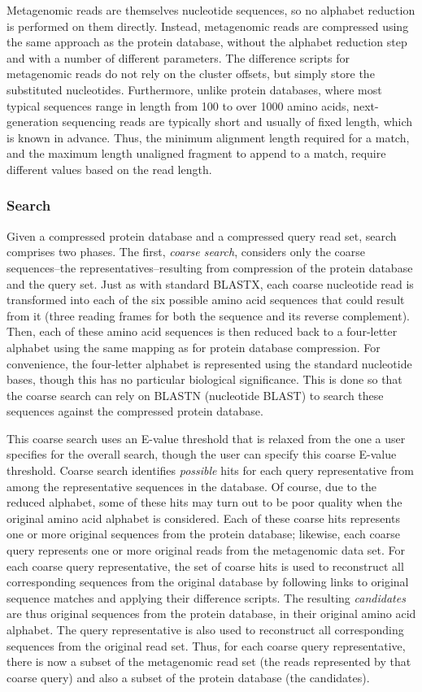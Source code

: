\documentclass{amsbook}
\theoremstyle{definition}
\theoremstyle{remark}
\numberwithin{equation}{section}
\begin{document}
Metagenomic reads are themselves nucleotide sequences, so no alphabet reduction
is performed on them directly.
Instead, metagenomic reads are compressed using the same approach as the
protein database, without the alphabet reduction step and with a number of
different parameters.
The difference scripts for metagenomic reads do not rely on the cluster offsets,
but simply store the substituted nucleotides.
Furthermore, unlike protein databases, where most typical sequences range in 
length from 100 to over 1000 amino acids, next-generation sequencing reads are 
typically short and usually of fixed length, which is known in advance.
Thus, the minimum alignment length required for a match, and the maximum
length unaligned fragment to append to a match, require different values based
on the read length.

\subsubsection*{Search}

Given a compressed protein database and a compressed query read set, search
comprises two phases.
The first, \emph{coarse search}, considers only the coarse sequences--the
representatives--resulting from compression of the protein database and the
query set.
Just as with standard BLASTX, each coarse nucleotide read is transformed into 
each of the six possible amino acid sequences that could result from it (three 
reading frames for both the sequence and its reverse complement).
Then, each of these amino acid sequences is then reduced back to a four-letter
alphabet using the same mapping as for protein database compression.
For convenience, the four-letter alphabet is represented using the standard
nucleotide bases, though this has no particular biological significance.
This is done so that the coarse search can rely on BLASTN (nucleotide BLAST) to
search these sequences against the compressed protein database.

This coarse search uses an E-value threshold that is relaxed from the one a user
specifies for the overall search, though the user can specify this coarse 
E-value threshold.
Coarse search identifies \emph{possible} hits for each query representative from
among the representative sequences in the database.
Of course, due to the reduced alphabet, some of these hits may turn out to be
poor quality when the original amino acid alphabet is considered.
Each of these coarse hits represents one or more original sequences from the
protein database; likewise, each coarse query represents one or more original
reads from the metagenomic data set.
For each coarse query representative, the set of coarse hits is used to
reconstruct all corresponding sequences from the original database by following
links to original sequence matches and applying their difference scripts.
The resulting \emph{candidates} are thus original sequences from the protein
database, in their original amino acid alphabet.
The query representative is also used to reconstruct all corresponding sequences
from the original read set.
Thus, for each coarse query representative, there is now a subset of the
metagenomic read set (the reads represented by that coarse query) and also a
subset of the protein database (the candidates).
\end{document}
